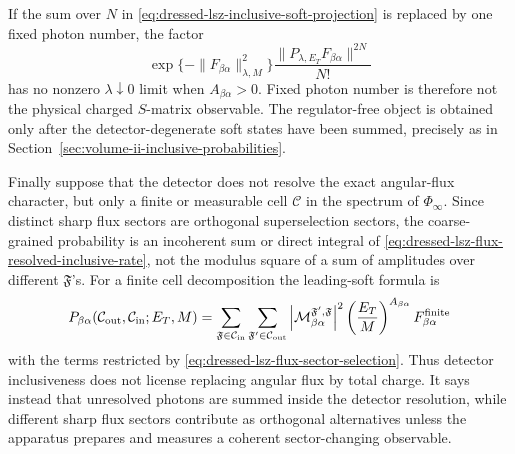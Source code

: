 If the sum over \(N\) in
\eqref{eq:dressed-lsz-inclusive-soft-projection} is replaced by one fixed
photon number, the factor
\[
  \exp\{-\|F_{\beta\alpha}\|_{\lambda,M}^2\}
  \frac{\|P_{\lambda,E_T}F_{\beta\alpha}\|^{2N}}{N!}
\]
has no nonzero \(\lambda\downarrow0\) limit when
\(A_{\beta\alpha}>0\).  Fixed photon number is therefore not the physical
charged \(S\)-matrix observable.  The regulator-free object is obtained only
after the detector-degenerate soft states have been summed, precisely as in
Section~\ref{sec:volume-ii-inclusive-probabilities}.

Finally suppose that the detector does not resolve the exact angular-flux
character, but only a finite or measurable cell
\(\mathcal C\) in the spectrum of \(\Phi_\infty\).  Since distinct sharp
flux sectors are orthogonal superselection sectors, the coarse-grained
probability is an incoherent sum or direct integral of
\eqref{eq:dressed-lsz-flux-resolved-inclusive-rate}, not the modulus square
of a sum of amplitudes over different \(\mathfrak F\)'s.  For a finite
cell decomposition the leading-soft formula is
\[
  P_{\beta\alpha}(\mathcal C_{\rm out},\mathcal C_{\rm in};E_T,M)
  =
  \sum_{\mathfrak F\in\mathcal C_{\rm in}}
  \sum_{\mathfrak F'\in\mathcal C_{\rm out}}
  \left|
    \mathcal M^{\mathfrak F',\mathfrak F}_{\beta\alpha}
  \right|^2
  \left(\frac{E_T}{M}\right)^{A_{\beta\alpha}}
  F_{\beta\alpha}^{\rm finite}
\]
with the terms restricted by
\eqref{eq:dressed-lsz-flux-sector-selection}.  Thus detector inclusiveness
does not license replacing angular flux by total charge.  It says instead
that unresolved photons are summed inside the detector resolution, while
different sharp flux sectors contribute as orthogonal alternatives unless the
apparatus prepares and measures a coherent sector-changing observable.

